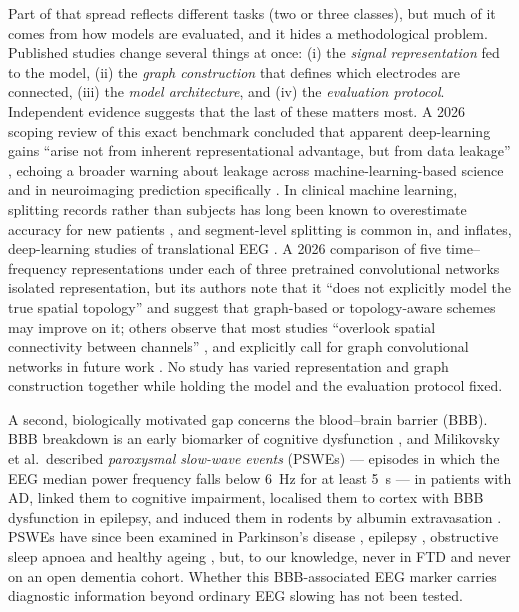 Part of that spread reflects different tasks (two or three classes), but much of it comes from how
models are evaluated, and it hides a methodological problem. Published
studies change several things at once: (i) the \emph{signal representation} fed to the model,
(ii) the \emph{graph construction} that defines which electrodes are connected, (iii) the
\emph{model architecture}, and (iv) the \emph{evaluation protocol}. Independent evidence suggests
that the last of these matters most. A 2026 scoping review of this exact benchmark concluded that
apparent deep-learning gains ``arise not from inherent representational advantage, but from data
leakage'' \cite{R1}, echoing a broader warning about leakage across machine-learning-based science
\cite{F8} and in neuroimaging prediction specifically \cite{L5}. In clinical machine learning,
splitting records rather than subjects has long been known to overestimate accuracy for new
patients \cite{L1}, and segment-level splitting is common in, and inflates, deep-learning studies of
translational EEG \cite{L2,L3}. A 2026 comparison of five time--frequency representations under each of three pretrained
convolutional networks \cite{R2} isolated representation, but its authors note that it ``does not
explicitly model the true spatial topology'' and suggest that graph-based or topology-aware schemes
may improve on it; others observe that most
studies ``overlook spatial connectivity between channels'' \cite{R9}, and explicitly call for graph
convolutional networks in future work \cite{R8,F7}. No study has varied representation and graph
construction together while holding the model and the evaluation protocol fixed.

A second, biologically motivated gap concerns the blood--brain barrier (BBB). BBB breakdown is an
early biomarker of cognitive dysfunction \cite{B5,B8}, and Milikovsky et al.\ described
\emph{paroxysmal slow-wave events} (PSWEs) --- episodes in which the EEG median power frequency
falls below \SI{6}{\hertz} for at least \SI{5}{\second} --- in patients with AD, linked them to
cognitive impairment, localised them to cortex with BBB dysfunction in epilepsy, and induced them in
rodents by albumin extravasation \cite{B1,B2}. PSWEs have since been examined in Parkinson's disease
\cite{B3}, epilepsy \cite{B4}, obstructive sleep apnoea \cite{pswe_osa} and healthy ageing
\cite{pswe_healthy}, but, to our knowledge, never in FTD and never on an open
dementia cohort. Whether this BBB-associated EEG marker carries diagnostic information beyond
ordinary EEG slowing has not been tested.

